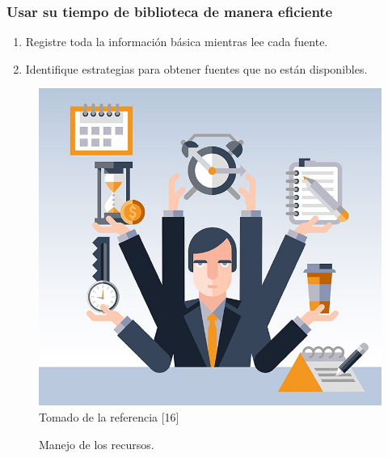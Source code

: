 \documentclass{beamer}
\newcounter{sauvegardeenumi}
\newcommand{\asuivre}{\setcounter{sauvegardeenumi}{\theenumi}}
\newcommand{\suite}{\setcounter{enumi}{\thesauvegardeenumi}}
\begin{document}
        \begin{frame}\frametitle{Usar su tiempo de biblioteca de manera eficiente}
        \begin{multicols}{2}
            \begin{enumerate}
                \suite
                \item Registre toda la informaci\'on b\'asica mientras lee cada fuente.
                \item Identifique estrategias para obtener fuentes que no est\'an disponibles.            
                \asuivre
            \end{enumerate}
             \begin{figure}
                \includegraphics[scale=0.20]{figures/timeManagement2}
                \newline
                {\tiny Tomado de la referencia [16] }
                \caption{Manejo de los recursos. }
            \end{figure}
        \end{multicols}
         \end{frame}
\end{document}
